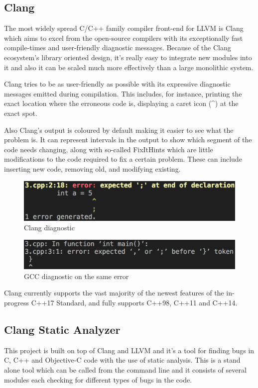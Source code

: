 \subsection{Clang}
\par The most widely spread C/C++ family compiler front-end for LLVM is Clang which aims to excel from the open-source compilers with its exceptionally fast compile-times and user-friendly diagnostic messages\cite{clang_features}. Because of the Clang ecosystem's library oriented design, it's really easy to integrate new modules into it and also it can be scaled much more effectively than a large monolithic system. \medskip
\par Clang tries to be as user-friendly as possible with its expressive diagnostic messages emitted during compilation. This includes, for instance, printing the exact location where the erroneous code is, displaying a caret icon (\textasciicircum) at the exact spot. \medskip
\par Also Clang's output is coloured by default making it easier to see what the problem is. It can represent intervals in the output to show which segment of the code needs changing, along with so-called FixItHints which are little modifications to the code required to fix a certain problem. These can include inserting new code, removing old, and modifying existing.
\begin{figure}[h]
    \caption{Clang diagnostic}
    \includegraphics[scale = 0.42]{images/clang_diag}
\end{figure}
\begin{figure}[h]
    \caption{GCC diagnostic on the same error}
    \includegraphics[scale = 0.352]{images/gcc_diag}
\end{figure}
\par Clang currently supports the vast majority of the newest features of the in-progress C++17 Standard, and fully supports C++98, C++11 and C++14\cite{clang_language_support}.
\subsection{Clang Static Analyzer}
\par This project is built on top of Clang and LLVM and it's a tool for finding bugs in C, C++ and Objective-C code with the use of static analysis. This is a stand alone tool which can be called from the command line and it consists of several modules each checking for different types of bugs in the code.
